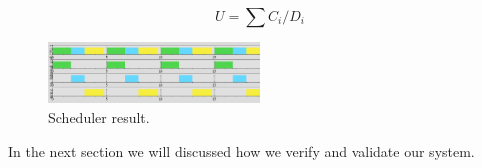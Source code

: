 \begin{equation}
\label{eq:utilization}
U = \sum C_{i} / D_{i}
\end{equation}
\begin{figure}[ht]
    \centering
    \includegraphics[width=0.5\textwidth]{images/schedule.png}
    \caption{Scheduler result.}
    \label{img:schedule}
\end{figure}

In the next section we will discussed how we verify and validate our system.




